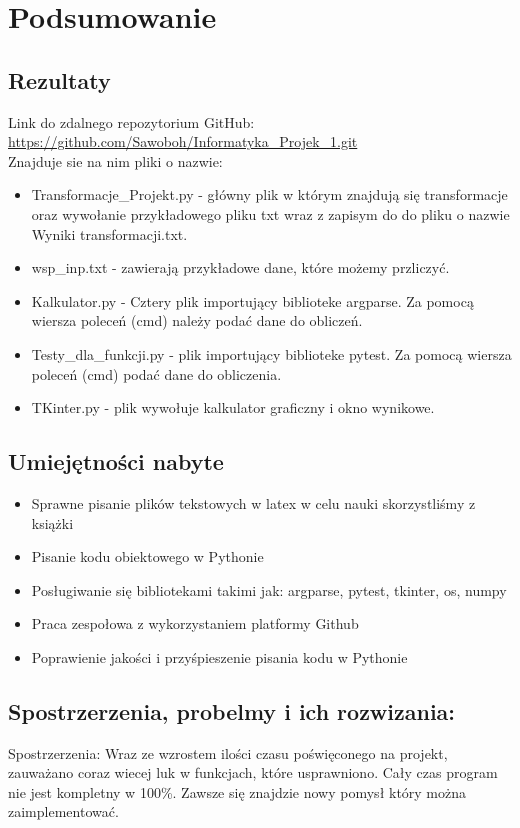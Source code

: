 \section{Podsumowanie}

\subsection{Rezultaty}
Link do zdalnego repozytorium GitHub: \href{https://github.com/Sawoboh/Informatyka_Projek_1.git}{https://github.com/Sawoboh/Informatyka\_{}Projek\_{}1.git} \\
Znajduje sie na nim pliki o nazwie:
\begin{itemize}
\item Transformacje\_{}Projekt.py - główny plik w którym znajdują się transformacje oraz wywołanie przykładowego pliku txt wraz z zapisym do do pliku o nazwie Wyniki transformacji.txt.
\item wsp\_{}inp.txt - zawierają przykładowe dane, które możemy przliczyć. 
\item Kalkulator.py -  Cztery plik importujący biblioteke argparse. Za pomocą wiersza poleceń (cmd) należy  podać dane do obliczeń.
\item Testy\_{}dla\_{}funkcji.py - plik importujący biblioteke pytest. Za pomocą wiersza poleceń (cmd) podać dane do obliczenia.
\item TKinter.py - plik wywołuje kalkulator graficzny i okno wynikowe. 
\end{itemize}

\subsection{Umiejętności nabyte}
\begin{itemize}
	\item Sprawne pisanie plików tekstowych w latex w celu nauki skorzystliśmy z książki \citep{Borkowski.Przybylski2015}
	\item Pisanie kodu obiektowego w Pythonie 
	\item Posługiwanie się bibliotekami takimi jak: argparse, pytest, tkinter, os, numpy \citep{argparse} \citep{argparse2}
	\item Praca zespołowa z wykorzystaniem platformy Github
	\item Poprawienie jakości i przyśpieszenie pisania kodu w Pythonie
\end{itemize}

\subsection{Spostrzerzenia, probelmy i ich rozwizania:}
Spostrzerzenia:
Wraz ze wzrostem ilości czasu poświęconego na projekt, zauważano coraz wiecej luk w funkcjach, które usprawniono. Cały czas program nie jest kompletny w 100\%. Zawsze się znajdzie nowy pomysł który można zaimplementować.

